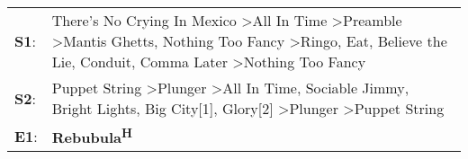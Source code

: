 \begin{supertabular}{p{0.03\textwidth}p{0.92\textwidth}}
 \textbf{S1}:  &  There's No Crying In Mexico\textsuperscript{} \textgreater \enspace All In Time\textsuperscript{} \textgreater \enspace Preamble\textsuperscript{} \textgreater \enspace Mantis Ghetts\textsuperscript{}, \enspace Nothing Too Fancy\textsuperscript{} \textgreater \enspace Ringo\textsuperscript{}, \enspace Eat\textsuperscript{}, \enspace Believe the Lie\textsuperscript{}, \enspace Conduit\textsuperscript{}, \enspace Comma Later\textsuperscript{} \textgreater \enspace Nothing Too Fancy\textsuperscript{}  \enspace  \\
 \textbf{S2}:  &                                                                                                                                        Puppet String\textsuperscript{} \textgreater \enspace Plunger\textsuperscript{} \textgreater \enspace All In Time\textsuperscript{}, \enspace Sociable Jimmy\textsuperscript{}, \enspace Bright Lights, Big City[1]\textsuperscript{}, \enspace Glory[2]\textsuperscript{} \textgreater \enspace Plunger\textsuperscript{} \textgreater \enspace Puppet String\textsuperscript{}  \enspace  \\
 \textbf{E1}:  &                                                                                                                                                                                                                                                                                                                                                                                                                                                                                    \textbf{Rebubula\textsuperscript{H}}  \enspace  \\
\end{supertabular}
